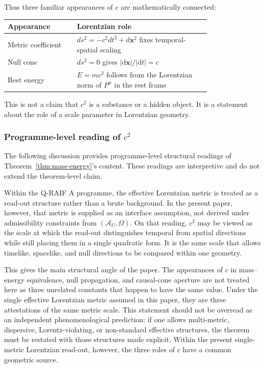 \documentclass[12pt,a4paper]{article}
\theoremstyle{definition}
\theoremstyle{remark}
\newcommand{\AU}{\mathcal{A}_U}
\newcommand{\Omegastate}{\Omega}
\begin{document}
Thus three familiar appearances of $c$ are mathematically connected:

\begin{center}
\begin{tabular}{P{0.27\linewidth}P{0.52\linewidth}}
\toprule
\textbf{Appearance} & \textbf{Lorentzian role} \\
\midrule
Metric coefficient & $ds^2=-c^2dt^2+d\mathbf{x}^2$ fixes temporal-spatial scaling \\
Null cone & $ds^2=0$ gives $|\mathrm d\mathbf{x}|/|\mathrm dt|=c$ \\
Rest energy & $E=mc^2$ follows from the Lorentzian norm of $P^\mu$ in the rest frame \\
\bottomrule
\end{tabular}
\end{center}

This is not a claim that $c^2$ is a substance or a hidden object. It is a statement about the role of a scale parameter in Lorentzian geometry.

\subsubsection{Programme-level reading of \texorpdfstring{$c^2$}{c2}}

The following discussion provides programme-level structural readings of Theorem~\ref{thm:mass-energy}'s content. These readings are interpretive and do not extend the theorem-level claim.

Within the Q-RAIF A programme, the effective Lorentzian metric is treated as a read-out structure rather than a brute background. In the present paper, however, that metric is supplied as an interface assumption, not derived under admissibility constraints from $(\AU,\Omegastate)$. On that reading, $c^2$ may be viewed as the scale at which the read-out distinguishes temporal from spatial directions while still placing them in a single quadratic form. It is the same scale that allows timelike, spacelike, and null directions to be compared within one geometry.

This gives the main structural angle of the paper. The appearances of $c$ in mass--energy equivalence, null propagation, and causal-cone aperture are not treated here as three unrelated constants that happen to have the same value. Under the single effective Lorentzian metric assumed in this paper, they are three attestations of the same metric scale. This statement should not be overread as an independent phenomenological prediction: if one allows multi-metric, dispersive, Lorentz-violating, or non-standard effective structures, the theorem must be restated with those structures made explicit. Within the present single-metric Lorentzian read-out, however, the three roles of $c$ have a common geometric source.
\end{document}
